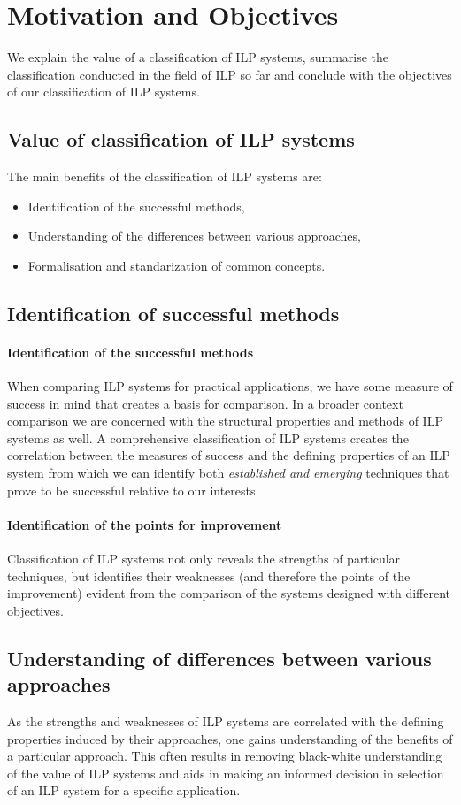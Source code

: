 \section{Motivation and Objectives}
We explain the value of a classification of ILP systems, summarise the classification conducted in the field of ILP so far and conclude with the objectives of our classification of ILP systems.

\subsection{Value of classification of ILP systems}
The main benefits of the classification of ILP systems are:
\begin{itemize}
\item Identification of the successful methods,
\item Understanding of the differences between various approaches,
\item Formalisation and standarization of common concepts.
\end{itemize}

\subsection{Identification of successful methods}
\paragraph{Identification of the successful methods}
When comparing ILP systems for practical applications, we have some measure of success in mind that creates a basis for comparison. In a broader context comparison we are concerned with the structural properties and methods of ILP systems as well.
A comprehensive classification of ILP systems creates the correlation between the measures of success and the defining properties of an ILP system from which we can identify both \emph{established and emerging} techniques that prove to be successful relative to our interests.
\paragraph{Identification of the points for improvement}
Classification of ILP systems not only reveals the strengths of particular techniques, but identifies their weaknesses (and therefore the points of the improvement) evident from the comparison of the systems designed with different objectives.
\subsection{Understanding of differences between various approaches}
As the strengths and weaknesses of ILP systems are correlated with the defining properties induced by their approaches, one gains understanding of the benefits of a particular approach. This often results in removing black-white understanding of the value of ILP systems and aids in making an informed decision in selection of an ILP system for a specific application.

